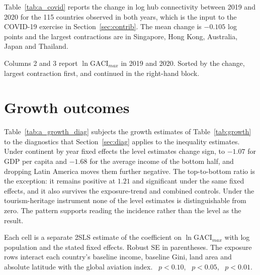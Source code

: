 Table~\ref{tab:a_covid} reports the change in log hub connectivity between 2019 and 2020 for the 115 countries observed in both years, which is the input to the COVID-19 exercise in Section~\ref{sec:contrib}. The mean change is $-0.105$ log points and the largest contractions are in Singapore, Hong Kong, Australia, Japan and Thailand.

\begin{table}[H]\centering\caption{Change in log hub connectivity, 2019 to 2020, by country.}\label{tab:a_covid}
\begin{threeparttable}\scriptsize
\begin{tablenotes}\scriptsize\item Columns 2 and 3 report $\ln\mathrm{GACI}_{max}$ in 2019 and 2020. Sorted by the change, largest contraction first, and continued in the right-hand block.\end{tablenotes}\end{threeparttable}\end{table}

\section{Growth outcomes}
\label{app:growth}
Table~\ref{tab:a_growth_diag} subjects the growth estimates of Table~\ref{tab:growth} to the diagnostics that Section~\ref{sec:diag} applies to the inequality estimates. Under continent by year fixed effects the level estimates change sign, to $-1.07$ for GDP per capita and $-1.68$ for the average income of the bottom half, and dropping Latin America moves them further negative. The top-to-bottom ratio is the exception: it remains positive at $1.21$ and significant under the same fixed effects, and it also survives the exposure-trend and combined controls. Under the tourism-heritage instrument none of the level estimates is distinguishable from zero. The pattern supports reading the incidence rather than the level as the result.

\begin{table}[H]\centering\caption{Identification diagnostics for the growth outcomes.}\label{tab:a_growth_diag}
\begin{threeparttable}\small
\begin{tablenotes}\footnotesize\item Each cell is a separate 2SLS estimate of the coefficient on $\ln\mathrm{GACI}_{max}$ with log population and the stated fixed effects. Robust SE in parentheses. The exposure rows interact each country's baseline income, baseline Gini, land area and absolute latitude with the global aviation index. \sym{*}~$p<0.10$, \sym{**}~$p<0.05$, \sym{***}~$p<0.01$.\end{tablenotes}\end{threeparttable}\end{table}


